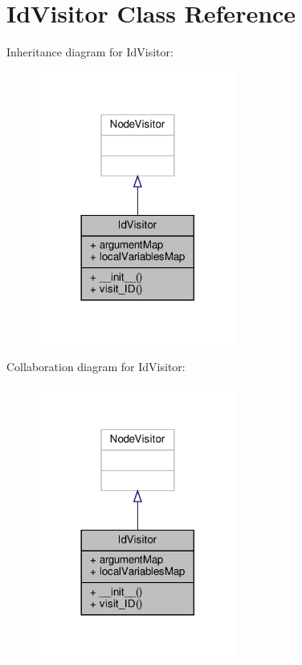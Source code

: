 \hypertarget{classVisitors_1_1IdVisitor}{}\section{Id\+Visitor Class Reference}
\label{classVisitors_1_1IdVisitor}


Inheritance diagram for Id\+Visitor\+:\nopagebreak
\begin{figure}[H]
\begin{center}
\leavevmode
\includegraphics[width=185pt]{classVisitors_1_1IdVisitor__inherit__graph}
\end{center}
\end{figure}


Collaboration diagram for Id\+Visitor\+:\nopagebreak
\begin{figure}[H]
\begin{center}
\leavevmode
\includegraphics[width=185pt]{classVisitors_1_1IdVisitor__coll__graph}
\end{center}
\end{figure}
